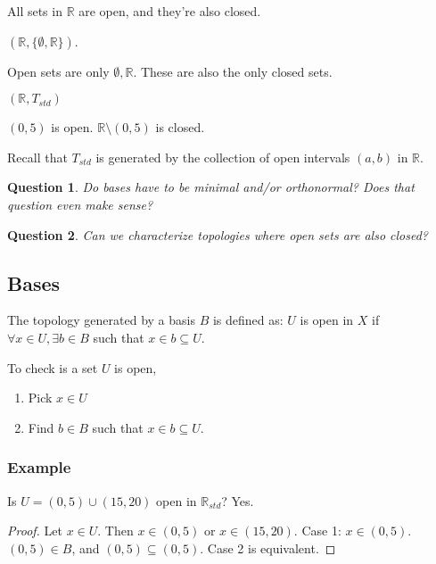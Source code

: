 \documentclass[11pt]{article}
\newtheorem{question}{Question}[section]
\begin{document}
All sets in \(\mathbb{R}\) are open, and they're also closed. 

\((\mathbb{R}, \{\emptyset, \mathbb{R}\})\).

Open sets are only \(\emptyset, \mathbb{R}\). These are also the only
closed sets. 

\((\mathbb{R}, T_{std})\)

\((0,5)\) is open. \(\mathbb{R}\setminus (0,5)\) is closed.

Recall that \(T_{std}\) is generated by the collection of open intervals
\((a,b)\) in \(\mathbb{R}\). 

\begin{question}


Do bases have to be minimal and/or orthonormal? Does that question
even make sense? 
\end{question}

\begin{question}


Can we characterize topologies where open sets are also closed?
\end{question}

\subsection{Bases}
\label{sec:org4d7ca16}

The topology generated by a basis \(B\) is defined as: \(U\) is open in
\(X\) if \(\forall x \in U, \exists b \in B\) such that \(x \in b \subseteq
U\).

To check is a set \(U\) is open, 

\begin{enumerate}
\item Pick \(x \in U\)
\item Find \(b\in B\) such that \(x \in b \subseteq U\).
\end{enumerate}



\subsubsection{Example}
\label{sec:org68b4ac4}
Is \(U = (0,5)\cup(15,20)\) open in \(\mathbb{R}_{std}\)? Yes. 

\begin{proof}


Let \(x \in U\). Then \(x \in (0,5)\) or \(x \in (15,20)\). Case 1: \(x \in
(0,5)\). \((0,5) \in B\), and \((0,5) \subseteq (0,5)\). Case 2 is
equivalent.
\end{proof}
\end{document}
